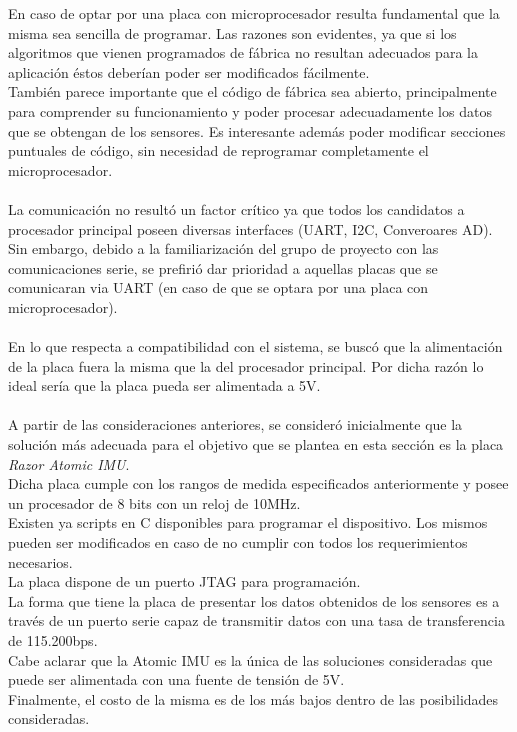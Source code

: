 \documentclass[main]{subfiles}
\begin{document}
En caso de optar por una placa con microprocesador resulta fundamental que la misma sea sencilla de programar. Las razones son evidentes, ya que si los algoritmos que vienen programados de f\'abrica no resultan adecuados para la aplicaci\'on \'estos deber\'ian poder ser modificados f\'acilmente.\\
Tambi\'en parece importante que el c\'odigo de f\'abrica sea abierto, principalmente para comprender su funcionamiento y poder procesar adecuadamente los datos que se obtengan de los sensores. Es interesante adem\'as poder modificar secciones puntuales de c\'odigo, sin necesidad de reprogramar completamente el microprocesador.\\
\\
La comunicaci\'on no result\'o un factor cr\'itico ya que todos los candidatos a procesador principal poseen diversas interfaces (UART, I2C, Converoares AD). Sin embargo, debido a la familiarizaci\'on del grupo de proyecto con las comunicaciones serie, se prefiri\'o dar prioridad a aquellas placas que se comunicaran via UART (en caso de que se optara por una placa con microprocesador).\\
\\
En lo que respecta a compatibilidad con el sistema, se busc\'o que la alimentaci\'on de la placa fuera la misma que la del procesador principal. Por dicha raz\'on lo ideal ser\'ia que la placa pueda ser alimentada a 5V.\\
\\
A partir de las consideraciones anteriores, se consider\'o inicialmente que la soluci\'on m\'as adecuada para el objetivo que se plantea en esta secci\'on es la placa \emph{Razor Atomic IMU}.\\
Dicha placa cumple con los rangos de medida especificados anteriormente y posee un procesador de 8 bits con un reloj de 10MHz.\\
Existen ya scripts en C disponibles para programar el dispositivo. Los mismos pueden ser modificados en caso de no cumplir con todos los requerimientos necesarios.\\
La placa dispone de un puerto JTAG para programaci\'on.\\
La forma que tiene la placa de presentar los datos obtenidos de los sensores es a trav\'es de un puerto serie capaz de transmitir datos con una tasa de transferencia de 115.200bps.\\
Cabe aclarar que la Atomic IMU es la \'unica de las soluciones consideradas que puede ser alimentada con una fuente de tensi\'on de 5V.\\
Finalmente, el costo de la misma es de los m\'as bajos dentro de las posibilidades consideradas.
\end{document}
